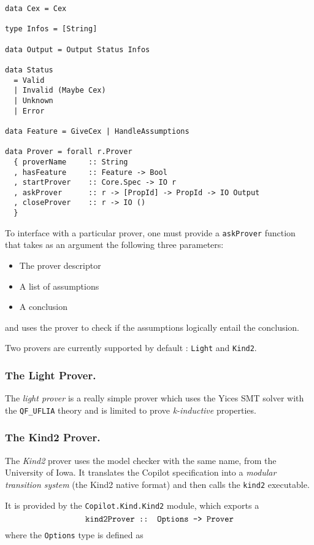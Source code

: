 \begin{lstlisting}[frame=single]
data Cex = Cex

type Infos = [String]

data Output = Output Status Infos

data Status
  = Valid
  | Invalid (Maybe Cex)
  | Unknown
  | Error
  
data Feature = GiveCex | HandleAssumptions
  
data Prover = forall r.Prover 
  { proverName     :: String
  , hasFeature     :: Feature -> Bool
  , startProver    :: Core.Spec -> IO r
  , askProver      :: r -> [PropId] -> PropId -> IO Output 
  , closeProver    :: r -> IO () 
  }

\end{lstlisting}

To interface with a  particular prover, one must  provide a \texttt{askProver} function that
takes as an argument  the following three parameters: 
\begin{itemize} 
\item  The prover descriptor 
\item  A list of assumptions 
\item  A conclusion
\end{itemize} 
and uses the prover to check if the assumptions logically entail the conclusion.

Two provers are currently supported by default : \texttt{Light} and \texttt{Kind2}.

\subsubsection{The Light Prover.}\label{the-light-prover}

The \emph{light prover} is a really simple prover which uses the Yices
SMT solver with the \texttt{QF\_UFLIA} theory and is limited to prove
\emph{k-inductive} properties.

\subsubsection{The Kind2 Prover.}\label{the-kind2-prover}

The \emph{Kind2} prover uses the model checker with the same name, from
the University of Iowa. It translates the Copilot specification into a
\emph{modular transition system} (the Kind2 native format) and then
calls the \texttt{kind2} executable.

It is provided by the \texttt{Copilot.Kind.Kind2} module, which exports
a $$\texttt{kind2Prover :: Options -\textgreater{} Prover}$$ where the
\texttt{Options} type is defined as

